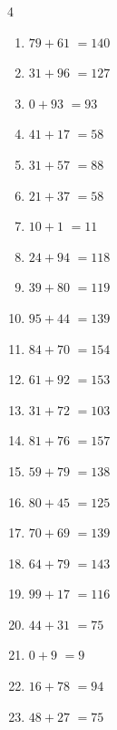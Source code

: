 \begin{multicols}{4}
\begin{enumerate}
  \item $79+61$
        $=140$

  \item $31+96$
        $=127$

  \item $0+93$
        $=93$

  \item $41+17$
        $=58$

  \item $31+57$
        $=88$

  \item $21+37$
        $=58$

  \item $10+1$
        $=11$

  \item $24+94$
        $=118$

  \item $39+80$
        $=119$

  \item $95+44$
        $=139$

  \item $84+70$
        $=154$

  \item $61+92$
        $=153$

  \item $31+72$
        $=103$

  \item $81+76$
        $=157$

  \item $59+79$
        $=138$

  \item $80+45$
        $=125$

  \item $70+69$
        $=139$

  \item $64+79$
        $=143$

\columnbreak %

  \item $99+17$
        $=116$

  \item $44+31$
        $=75$

  \item $0+9$
        $=9$

  \item $16+78$
        $=94$

  \item $48+27$
        $=75$


\end{enumerate}
\end{multicols}
